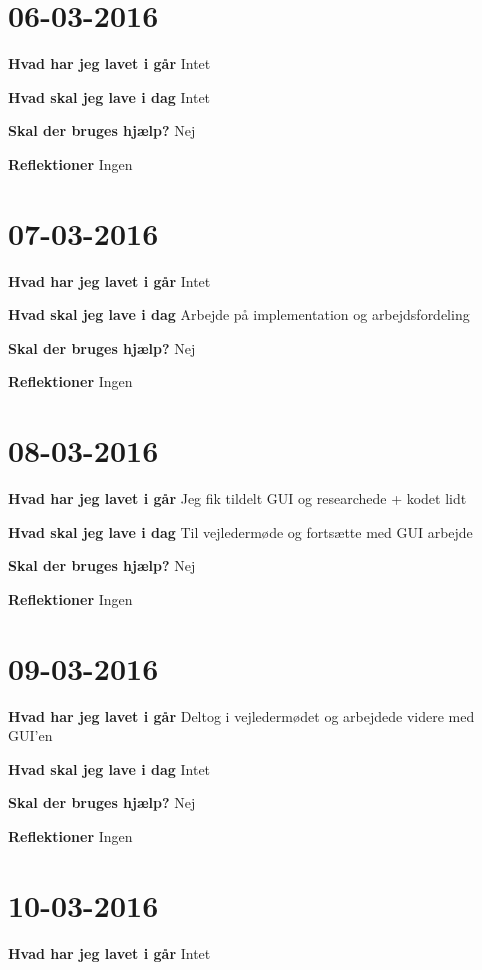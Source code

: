 \documentclass{article}
\begin{document}
	\section{06-03-2016}
	
	\textbf{Hvad har jeg lavet i går} Intet
	
	\textbf{Hvad skal jeg lave i dag} Intet
	
	\textbf{Skal der bruges hjælp?} Nej
	
	\textbf{Reflektioner} Ingen
	
	\section{07-03-2016}
	
	\textbf{Hvad har jeg lavet i går} Intet
	
	\textbf{Hvad skal jeg lave i dag} Arbejde på implementation og arbejdsfordeling
	
	\textbf{Skal der bruges hjælp?} Nej
	
	\textbf{Reflektioner} Ingen
	
	\section{08-03-2016}
	
	\textbf{Hvad har jeg lavet i går} Jeg fik tildelt GUI og researchede + kodet lidt
	
	\textbf{Hvad skal jeg lave i dag} Til vejledermøde og fortsætte med GUI arbejde
	
	\textbf{Skal der bruges hjælp?} Nej
	
	\textbf{Reflektioner} Ingen


	\section{09-03-2016}
	
	\textbf{Hvad har jeg lavet i går} Deltog i vejledermødet og arbejdede videre med GUI'en
	
	\textbf{Hvad skal jeg lave i dag} Intet	
	
	\textbf{Skal der bruges hjælp?} Nej
	
	\textbf{Reflektioner} Ingen
	

	\section{10-03-2016}
	
	\textbf{Hvad har jeg lavet i går} Intet 
	
\end{document}
